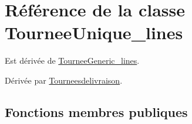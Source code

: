 \hypertarget{classTourneeUnique__lines}{}\section{Référence de la classe Tournee\+Unique\+\_\+lines}
\label{classTourneeUnique__lines}


Est dérivée de \hyperlink{classTourneeGeneric__lines}{Tournee\+Generic\+\_\+lines}.



Dérivée par \hyperlink{classTourneesdelivraison}{Tourneesdelivraison}.

\subsection*{Fonctions membres publiques}
